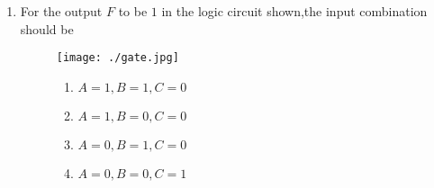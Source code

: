 \documentclass{article}
\begin{document}
\begin{enumerate}
\item For the output $F$ to be $1$ in the logic circuit shown,the input combination should be 
\begin{figure}[H]
\texttt{[image: ./gate.jpg]}
\label{fig:fig1}
\caption{}
\begin{enumerate}
\item $A=1,B=1,C=0$
\item $A=1,B=0,C=0$
\item $A=0,B=1,C=0$
\item $A=0,B=0,C=1$
\end{enumerate}
\end{figure}
\end{enumerate}
\end{document}
